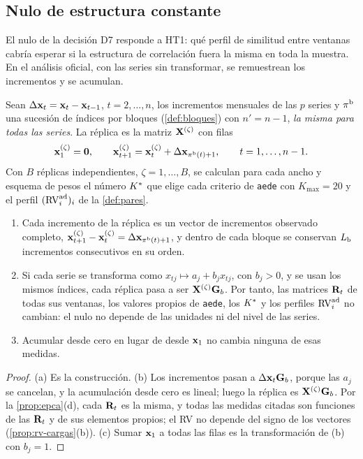 \subsection{Nulo de estructura constante}
\label{sec:nulo-estructura}

El nulo de la decisión D7 responde a HT1: qué perfil de similitud entre ventanas cabría esperar si
la estructura de correlación fuera la misma en toda la muestra. En el análisis oficial, con las
series sin transformar, se remuestrean los incrementos y se acumulan.

\begin{definicion}\label{def:nulo-estructura}
Sean $\Delta\mathbf{x}_{t}=\mathbf{x}_{t}-\mathbf{x}_{t-1}$, $t=2,\dots,n$, los incrementos mensuales de las $p$ series y
$\pi^{\mathrm{b}}$ una sucesión de índices por bloques (\cref{def:bloques}) con $n'=n-1$, \emph{la misma para
todas las series}. La réplica es la matriz $\mathbf{X}^{(\zeta)}$ con filas
\[
  \mathbf{x}^{(\zeta)}_1=\mathbf{0},\qquad \mathbf{x}^{(\zeta)}_{t+1}=\mathbf{x}^{(\zeta)}_t+\Delta\mathbf{x}_{\pi^{\mathrm{b}}(t)+1},\qquad
  t=1,\dots,n-1 .
\]
Con $B$ réplicas independientes, $\zeta=1,\dots,B$, se calculan para cada ancho y esquema de pesos
el número $K^{\ast}$ que elige cada criterio de \texttt{aede} con $K_{\max}=20$ y el perfil
$(\operatorname{RV}^{\mathrm{ad}}_{i})_i$ de la \cref{def:pares}.
\end{definicion}

\begin{proposicion}\label{prop:nulo-estructura}
\begin{enumerate}[label=(\alph*)]
  \item Cada incremento de la réplica es un vector de incrementos observado completo,
    $\mathbf{x}^{(\zeta)}_{t+1}-\mathbf{x}^{(\zeta)}_t=\Delta\mathbf{x}_{\pi^{\mathrm{b}}(t)+1}$, y dentro de cada bloque se conservan
    $L_{\mathrm{b}}$ incrementos consecutivos en su orden.
  \item Si cada serie se transforma como $x_{tj}\mapsto a_j+b_jx_{tj}$, con $b_j>0$, y se usan los
    mismos índices, cada réplica pasa a ser $\mathbf{X}^{(\zeta)}\mathbf{G}_b$. Por tanto, las matrices
    $\mathbf{R}_t$ de todas sus ventanas, los valores propios de \texttt{aede}, los $K^{\ast}$ y los perfiles
    $\operatorname{RV}^{\mathrm{ad}}_{i}$ no cambian: el nulo no depende de las unidades ni del nivel de las series.
  \item Acumular desde cero en lugar de desde $\mathbf{x}_1$ no cambia ninguna de esas medidas.
\end{enumerate}
\end{proposicion}

\begin{proof}
(a) Es la construcción. (b) Los incrementos pasan a $\Delta\mathbf{x}_t\mathbf{G}_b$, porque las $a_j$ se
cancelan, y la acumulación desde cero es lineal; luego la réplica es $\mathbf{X}^{(\zeta)}\mathbf{G}_b$.
Por la \cref{prop:epca}(d), cada $\mathbf{R}_t$ es la misma, y todas las medidas citadas son funciones de
las $\mathbf{R}_t$ y de sus elementos propios; el RV no depende del signo de los vectores
(\cref{prop:rv-cargas}(b)). (c) Sumar $\mathbf{x}_1$ a todas las filas es la transformación de (b) con
$b_j=1$.
\end{proof}


